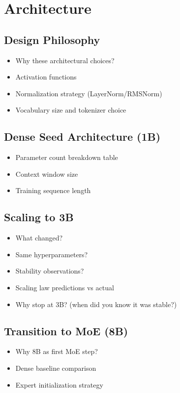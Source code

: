 \section{Architecture}
    \subsection{Design Philosophy}
        \begin{itemize}
            \item  Why these architectural choices?
            \item Activation functions
            \item Normalization strategy (LayerNorm/RMSNorm)
            \item Vocabulary size and tokenizer choice
        \end{itemize}
    
    \subsection{Dense Seed Architecture (1B)}
        \begin{itemize}
            \item Parameter count breakdown table
            \item Context window size
            \item Training sequence length
        \end{itemize}

    \subsection{Scaling to 3B}
     \begin{itemize}
         \item What changed?
         \item Same hyperparameters?
         \item Stability observations?
         \item Scaling law predictions vs actual
         \item  Why stop at 3B? (when did you know it was stable?)
     \end{itemize}

    \subsection{Transition to MoE (8B)}
    \begin{itemize}
        \item Why 8B as first MoE step?
        \item Dense baseline comparison
        \item Expert initialization strategy
    \end{itemize}

